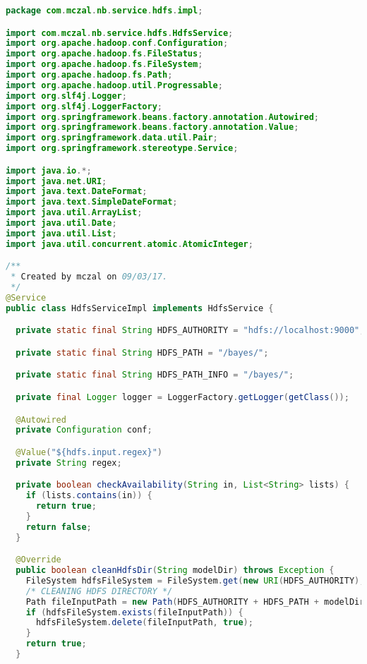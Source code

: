 \begin{lstlisting}[language=Java,basicstyle=\tiny,caption=HdfsServiceImpl.java]
package com.mczal.nb.service.hdfs.impl;

import com.mczal.nb.service.hdfs.HdfsService;
import org.apache.hadoop.conf.Configuration;
import org.apache.hadoop.fs.FileStatus;
import org.apache.hadoop.fs.FileSystem;
import org.apache.hadoop.fs.Path;
import org.apache.hadoop.util.Progressable;
import org.slf4j.Logger;
import org.slf4j.LoggerFactory;
import org.springframework.beans.factory.annotation.Autowired;
import org.springframework.beans.factory.annotation.Value;
import org.springframework.data.util.Pair;
import org.springframework.stereotype.Service;

import java.io.*;
import java.net.URI;
import java.text.DateFormat;
import java.text.SimpleDateFormat;
import java.util.ArrayList;
import java.util.Date;
import java.util.List;
import java.util.concurrent.atomic.AtomicInteger;

/**
 * Created by mczal on 09/03/17.
 */
@Service
public class HdfsServiceImpl implements HdfsService {

  private static final String HDFS_AUTHORITY = "hdfs://localhost:9000";

  private static final String HDFS_PATH = "/bayes/";

  private static final String HDFS_PATH_INFO = "/bayes/";

  private final Logger logger = LoggerFactory.getLogger(getClass());

  @Autowired
  private Configuration conf;

  @Value("${hdfs.input.regex}")
  private String regex;

  private boolean checkAvailability(String in, List<String> lists) {
    if (lists.contains(in)) {
      return true;
    }
    return false;
  }

  @Override
  public boolean cleanHdfsDir(String modelDir) throws Exception {
    FileSystem hdfsFileSystem = FileSystem.get(new URI(HDFS_AUTHORITY), conf);
    /* CLEANING HDFS DIRECTORY */
    Path fileInputPath = new Path(HDFS_AUTHORITY + HDFS_PATH + modelDir);
    if (hdfsFileSystem.exists(fileInputPath)) {
      hdfsFileSystem.delete(fileInputPath, true);
    }
    return true;
  }


\end{lstlisting}
